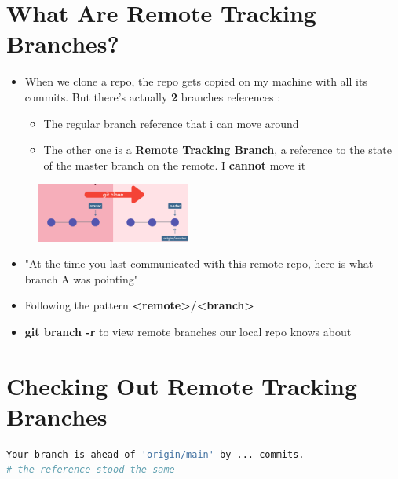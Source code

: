 \documentclass{report}
\begin{document}
\section{What Are Remote Tracking Branches?}

\begin{itemize}
	\item When we clone a repo, the repo gets copied on my machine with all its commits. But there's actually \textbf{2} branches references :
		\begin{itemize}
			\item The regular branch reference that i can move around 
			\item The other one is a \textbf{Remote Tracking Branch}, a reference to the state of the master branch on the remote. I \textbf{cannot} move it
		\end{itemize}
\end{itemize}

\begin{figure}[H] 
	 \centering 
	 \includegraphics[width=2in]{screenshots/2022-07-08T10-45-10Z.png} 
\end{figure}

\begin{itemize}
	\item "At the time you last communicated with this remote repo, here is what branch A was pointing" 
	\item Following the pattern \textbf{<remote>/<branch>} 
	\item \textbf{git branch -r} to view remote branches our local repo knows about
\end{itemize}


\section{Checking Out Remote Tracking Branches}

\begin{tcolorbox}[title=After some work on main branch,colback=backcolour]
\begin{lstlisting}[language=bash]
Your branch is ahead of 'origin/main' by ... commits.
# the reference stood the same
\end{lstlisting}
\end{tcolorbox}
\end{document}
